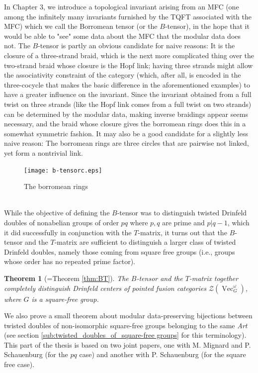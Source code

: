 \documentclass[a4paper, 10pt]{book}
\newtheorem{Thm}{Theorem}[chapter]
\theoremstyle{definition}
\numberwithin{equation}{chapter}
\newcommand\Vect{\operatorname{Vec}}
\newcommand\CTR{\mathcal Z}
\begin{document}
In Chapter 3, we introduce a topological invariant arising from an MFC (one among the infinitely many invariants furnished by the TQFT associated with the MFC) which we call the Borromean tensor (or the $B$-tensor), in the hope that it would be able to "see" some data about the MFC that the modular data does not. The $B$-tensor is partly an obvious candidate for naive reasons: It is the closure of a three-strand braid, which is the next more complicated thing over the two-strand braid whose closure is the Hopf link; having three strands might allow the associativity constraint of the category (which, after all, is encoded in the three-cocycle that makes the basic difference in the aforementioned examples)  to have a greater influence on the invariant. Since the invariant obtained from a full twist on three strands (like the Hopf link comes from a full twist on two strands) can be determined by the modular data, making inverse braidings appear seems necessary, and the braid whose closure gives the borromean rings does this in a somewhat symmetric fashion. It may also be a good candidate for a slightly less naive reason: The borromean rings are three circles that are pairwise not linked, yet form a nontrivial link.\\
\begin{figure}[h!]
\texttt{[image: b-tensorc.eps]}
\centering
\caption{The borromean rings}
\end{figure}\\
While the objective of defining the $B$-tensor was to distinguish twisted Drinfeld doubles of nonabelian groups of order $pq$ where $p,q$ are prime and $p|q-1$, which it did successfully in conjunction with the $T$-matrix, it turns out that the $B$-tensor and the $T$-matrix are sufficient to distinguish a larger class of twisted Drinfeld doubles, namely those coming from square free groups (i.e., groups whose order has no repeated prime factor).
\begin{Thm}[=Theorem \ref{thm:BT}]
 The $B$-tensor and the $T$-matrix together completely distinguish Drinfeld centers of pointed fusion categories $\CTR(\Vect^\omega_G)$, where $G$ is a square-free group.
 \end{Thm} 
We also prove a small theorem about modular data-preserving bijections between twisted doubles of non-isomorphic square-free groups belonging to the same \textit{Art} (see section \ref{sub:twisted_doubles_of_square-free groups} for this terminology). This part of the thesis is based on two joint papers, one with M. Mignard and P. Schauenburg (for the $pq$ case) and another with P. Schauenburg (for the square free case).\\\\
\end{document}
